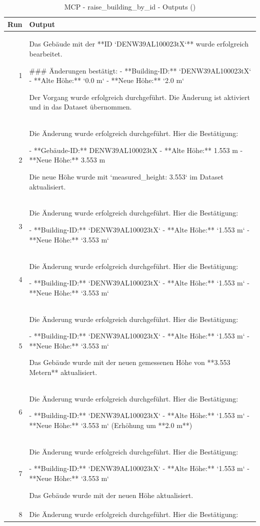 \documentclass[a4paper,11pt]{article}
\begin{document}
\begin{table}[ht]
\centering
\scriptsize
\caption{MCP - raise\_building\_by\_id - Outputs ()}
\label{tab:mcp\_raise\_building\_by\_id\_outputs\_}
\begin{tabular}{r p{12cm}}
\hline
Run & Output \\
\hline
1 & Das Gebäude mit der **ID `DENW39AL100023tX`** wurde erfolgreich bearbeitet.

\#\#\# Änderungen bestätigt:
- **Building-ID:** `DENW39AL100023tX`
- **Alte Höhe:** `0.0 m`
- **Neue Höhe:** `2.0 m`

Der Vorgang wurde erfolgreich durchgeführt. Die Änderung ist aktiviert und in das Dataset übernommen. \\
2 & Die Änderung wurde erfolgreich durchgeführt. Hier die Bestätigung:

- **Gebäude-ID:** DENW39AL100023tX
- **Alte Höhe:** 1.553 m
- **Neue Höhe:** 3.553 m

Die neue Höhe wurde mit `measured\_height: 3.553` im Dataset aktualisiert. \\
3 & Die Änderung wurde erfolgreich durchgeführt. Hier die Bestätigung:

- **Building-ID:** `DENW39AL100023tX`
- **Alte Höhe:** `1.553 m`
- **Neue Höhe:** `3.553 m` \\
4 & Die Änderung wurde erfolgreich durchgeführt. Hier die Bestätigung:

- **Building-ID:** `DENW39AL100023tX`
- **Alte Höhe:** `1.553 m`
- **Neue Höhe:** `3.553 m` \\
5 & Die Änderung wurde erfolgreich durchgeführt. Hier die Bestätigung:

- **Building-ID:** `DENW39AL100023tX`
- **Alte Höhe:** `1.553 m`
- **Neue Höhe:** `3.553 m`

Das Gebäude wurde mit der neuen gemessenen Höhe von **3.553 Metern** aktualisiert. \\
6 & Die Änderung wurde erfolgreich durchgeführt. Hier die Bestätigung:

- **Building-ID:** `DENW39AL100023tX`
- **Alte Höhe:** `1.553 m`
- **Neue Höhe:** `3.553 m` (Erhöhung um **2.0 m**) \\
7 & Die Änderung wurde erfolgreich durchgeführt. Hier die Bestätigung:

- **Building-ID:** `DENW39AL100023tX`
- **Alte Höhe:** `1.553 m`
- **Neue Höhe:** `3.553 m`

Das Gebäude wurde mit der neuen Höhe aktualisiert. \\
8 & Die Änderung wurde erfolgreich durchgeführt. Hier die Bestätigung:


\end{tabular}
\end{table}
\end{document}
